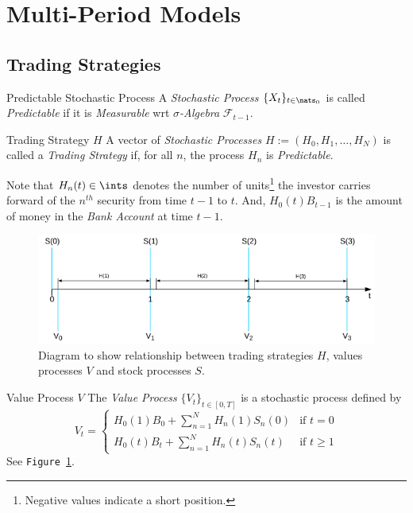 \documentclass[11pt,a4paper]{article}
\begin{document}
\section{Multi-Period Models} \label{sec_multi_period_models}

\subsection{Trading Strategies}

  \begin{definition}{Predictable Stochastic Process}
    A \textit{Stochastic Process} $\{X_t\}_{t\in\nats_0}$ is called \textit{Predictable} if it is \textit{Measurable} wrt \textit{$\sigma$-Algebra}  $\mathcal{F}_{t-1}$.
  \end{definition}

  \begin{definition}{Trading Strategy $H$}
    A vector of \textit{Stochastic Processes} $H:=(H_0,H_1,\dots,H_N)$ is called a \textit{Trading Strategy} if, for all $n$, the process $H_n$ is \textit{Predictable}.
    \par Note that $H_n(t)\in\ints$ denotes the number of units\footnote{Negative values indicate a short position.} the investor carries forward of the $n^{th}$ security from time $t-1$ to $t$. And, $H_0(t)B_{t-1}$ is the amount of money in the \textit{Bank Account} at time $t-1$.
  \end{definition}

  \begin{figure}[H]
    \centering\includegraphics[width=.7\textwidth]{TradingStrategiesAndValueProcess.PNG}
    \caption{Diagram to show relationship between trading strategies $H$, values processes $V$ and stock processes $S$.}
    \label{fig_trading_strats_and_value_processes}
  \end{figure}

  \begin{definition}{Value Process $V$}
    The \textit{Value Process} $\{V_t\}_{t\in[0,T]}$ is a stochastic process defined by
    \[ V_t=\begin{cases}
      H_0(1)B_0+\sum_{n=1}^NH_n(1)S_n(0)&\text{if }t=0\\
      H_0(t)B_t+\sum_{n=1}^NH_n(t)S_n(t)&\text{if }t\geq1
    \end{cases} \]
    See \texttt{Figure \ref{fig_trading_strats_and_value_processes}}.
  \end{definition}
\end{document}
